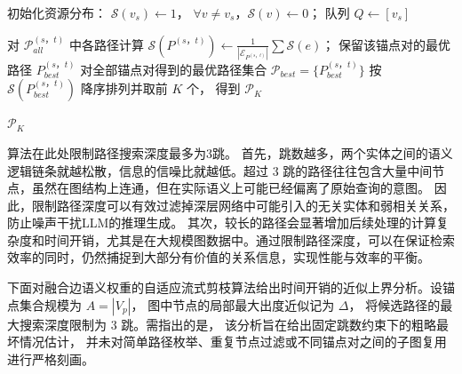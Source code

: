 \documentclass[promaster, vlined]{DissertUESTC}
\begin{document}
\begin{algorithm}[h]
    \SetAlgoLined
    \caption{融合边语义权重的自适应流式剪枝算法}
    \label{alg:pruning}
    
    
初始化资源分布： $\mathcal{S}(v_s) \leftarrow 1$， $\forall v \ne v_s， \mathcal{S}(v) \leftarrow 0$； 队列 $Q \leftarrow [v_s]$\;
    
    
对 $\mathcal{P}_{all}^{(s，t)}$ 中各路径计算 $\mathcal{S}(P^{(s，t)}) \leftarrow \frac{1}{|\mathcal{E}_{P^{(s，t)}}|} \sum \mathcal{S}(e)$； 保留该锚点对的最优路径 $P_{best}^{(s，t)}$\;
对全部锚点对得到的最优路径集合 $\mathcal{P}_{best}=\{P_{best}^{(s，t)}\}$ 按 $\mathcal{S}(P_{best}^{(s，t)})$ 降序排列并取前 $K$ 个， 得到 $\mathcal{P}_{K}$\;
    
    \Return $\mathcal{P}_{K}$
\end{algorithm}

算法在此处限制路径搜索深度最多为3跳。
首先，跳数越多，两个实体之间的语义逻辑链条就越松散，信息的信噪比就越低。超过 3 跳的路径往往包含大量中间节点，虽然在图结构上连通，但在实际语义上可能已经偏离了原始查询的意图。
因此，限制路径深度可以有效过滤掉深层网络中可能引入的无关实体和弱相关关系，防止噪声干扰LLM的推理生成。
其次，较长的路径会显著增加后续处理的计算复杂度和时间开销，尤其是在大规模图数据中。通过限制路径深度，可以在保证检索效率的同时，仍然捕捉到大部分有价值的关系信息，实现性能与效率的平衡。

下面对融合边语义权重的自适应流式剪枝算法给出时间开销的近似上界分析。设锚点集合规模为 $A=|V_p|$， 图中节点的局部最大出度近似记为 $\Delta$， 将候选路径的最大搜索深度限制为 3 跳。需指出的是， 该分析旨在给出固定跳数约束下的粗略最坏情况估计， 并未对简单路径枚举、重复节点过滤或不同锚点对之间的子图复用进行严格刻画。
\end{document}
